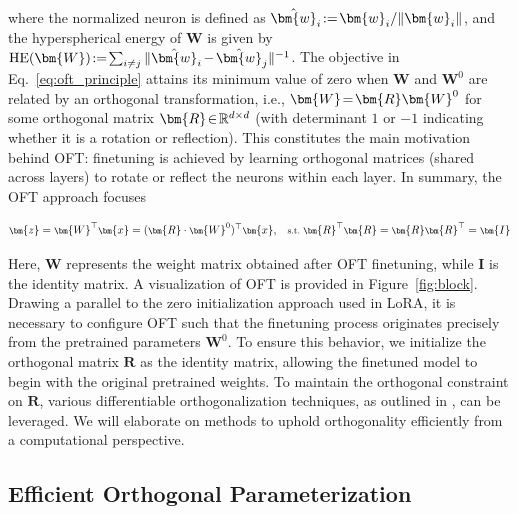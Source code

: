 where the normalized neuron is defined as $\thickmuskip=2mu \medmuskip=2mu \hat{\bm{w}}_i:=\bm{w}_i/\|\bm{w}_i\|$, and the hyperspherical energy of $\bm{W}$ is given by $\thickmuskip=2mu \medmuskip=2mu \text{HE}(\bm{W}):= \sum_{i\neq j} \|\hat{\bm{w}}_i-\hat{\bm{w}}_j\|^{-1}$. The objective in Eq.~\eqref{eq:oft_principle} attains its minimum value of zero when $\bm{W}$ and $\bm{W}^0$ are related by an orthogonal transformation, i.e., $\thickmuskip=2mu \medmuskip=2mu \bm{W}=\bm{R}\bm{W}^0$ for some orthogonal matrix $\thickmuskip=2mu \medmuskip=2mu \bm{R}\in\mathbb{R}^{d\times d}$ (with determinant $1$ or $-1$ indicating whether it is a rotation or reflection). This constitutes the main motivation behind OFT: finetuning is achieved by learning orthogonal matrices (shared across layers) to rotate or reflect the neurons within each layer. In summary, the OFT approach focuses

\begin{equation}\label{eq:oft_general}
    \footnotesize
    \bm{z}=\bm{W}^\top\bm{x}=(\bm{R}\cdot\bm{W}^0)^\top\bm{x},~~~\text{s.t.}~\bm{R}^\top\bm{R}=\bm{R}\bm{R}^\top=\bm{I}
\end{equation}

Here, $\bm{W}$ represents the weight matrix obtained after OFT finetuning, while $\bm{I}$ is the identity matrix. A visualization of OFT is provided in Figure~\ref{fig:block}. Drawing a parallel to the zero initialization approach used in LoRA, it is necessary to configure OFT such that the finetuning process originates precisely from the pretrained parameters $\bm{W}^0$. To ensure this behavior, we initialize the orthogonal matrix $\bm{R}$ as the identity matrix, allowing the finetuned model to begin with the original pretrained weights. To maintain the orthogonal constraint on $\bm{R}$, various differentiable orthogonalization techniques, as outlined in \cite{liu2021orthogonal,lezcano2019cheap}, can be leveraged. We will elaborate on methods to uphold orthogonality efficiently from a computational perspective.

\subsection{Efficient Orthogonal Parameterization}\label{sect:eff_ortho}

